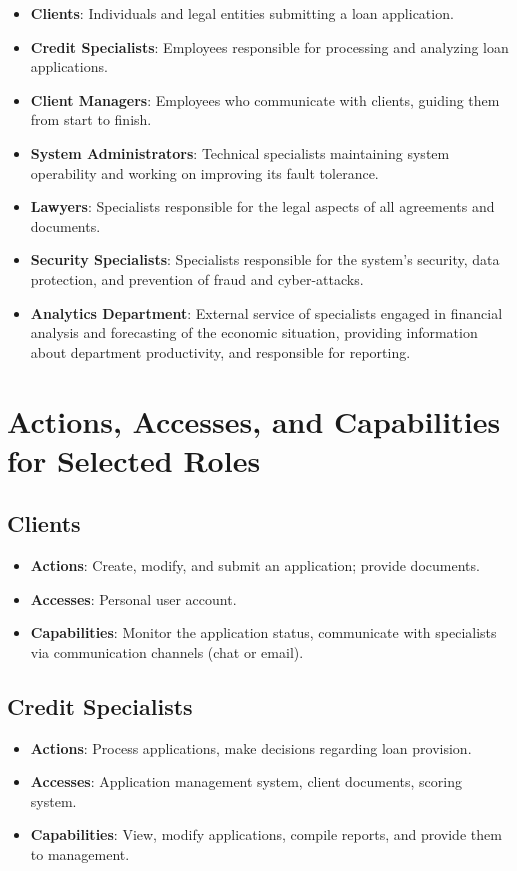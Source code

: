 \documentclass[20pt]{article}
\begin{document}
\begin{itemize}
    \item \textbf{Clients}: Individuals and legal entities submitting a loan application.
    \item \textbf{Credit Specialists}: Employees responsible for processing and analyzing loan applications.
    \item \textbf{Client Managers}: Employees who communicate with clients, guiding them from start to finish.
    \item \textbf{System Administrators}: Technical specialists maintaining system operability and working on improving its fault tolerance.
    \item \textbf{Lawyers}: Specialists responsible for the legal aspects of all agreements and documents.
    \item \textbf{Security Specialists}: Specialists responsible for the system’s security, data protection, and prevention of fraud and cyber-attacks.
    \item \textbf{Analytics Department}: External service of specialists engaged in financial analysis and forecasting of the economic situation, providing information about department productivity, and responsible for reporting.
\end{itemize}

\section{Actions, Accesses, and Capabilities for Selected Roles}

\subsection{Clients}
\begin{itemize}
    \item \textbf{Actions}: Create, modify, and submit an application; provide documents.
    \item \textbf{Accesses}: Personal user account.
    \item \textbf{Capabilities}: Monitor the application status, communicate with specialists via communication channels (chat or email).
\end{itemize}

\subsection{Credit Specialists}
\begin{itemize}
    \item \textbf{Actions}: Process applications, make decisions regarding loan provision.
    \item \textbf{Accesses}: Application management system, client documents, scoring system.
    \item \textbf{Capabilities}: View, modify applications, compile reports, and provide them to management.
\end{itemize}
\end{document}
